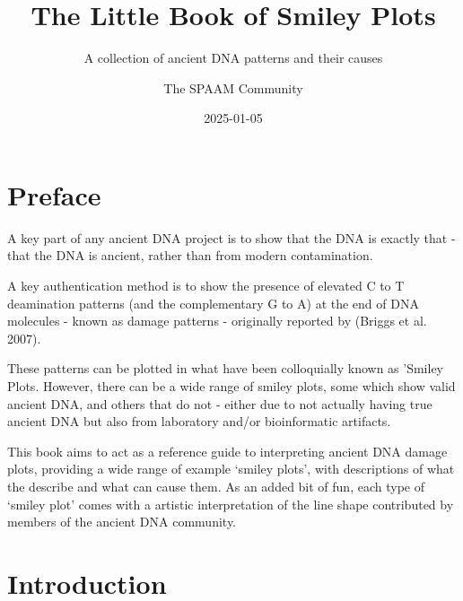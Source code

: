 \documentclass[
  letterpaper,
  DIV=11,
  numbers=noendperiod]{scrreprt}
\title{The Little Book of Smiley Plots}
\subtitle{A collection of ancient DNA patterns and their causes}
\author{The SPAAM Community}
\date{2025-01-05}
\renewcommand*\contentsname{Table of contents}
\newcommand\contentsname{Table of contents}
\begin{document}
\maketitle
\ifdefined\Shaded\renewenvironment{Shaded}{\begin{tcolorbox}[borderline west={3pt}{0pt}{shadecolor}, frame hidden, sharp corners, enhanced, breakable, interior hidden, boxrule=0pt]}{\end{tcolorbox}}\fi

\renewcommand*\contentsname{Table of contents}
{
\hypersetup{linkcolor=}
\setcounter{tocdepth}{2}
\tableofcontents
}

\hypertarget{preface}{%
\chapter*{Preface}\label{preface}}


A key part of any ancient DNA project is to show that the DNA is exactly
that - that the DNA is ancient, rather than from modern contamination.

A key authentication method is to show the presence of elevated C to T
deamination patterns (and the complementary G to A) at the end of DNA
molecules - known as damage patterns - originally reported by (Briggs et
al. 2007).

These patterns can be plotted in what have been colloquially known as
'Smiley Plots. However, there can be a wide range of smiley plots, some
which show valid ancient DNA, and others that do not - either due to not
actually having true ancient DNA but also from laboratory and/or
bioinformatic artifacts.

This book aims to act as a reference guide to interpreting ancient DNA
damage plots, providing a wide range of example `smiley plots', with
descriptions of what the describe and what can cause them. As an added
bit of fun, each type of `smiley plot' comes with a artistic
interpretation of the line shape contributed by members of the ancient
DNA community.


\hypertarget{introduction}{%
\chapter*{Introduction}\label{introduction}}
\end{document}
